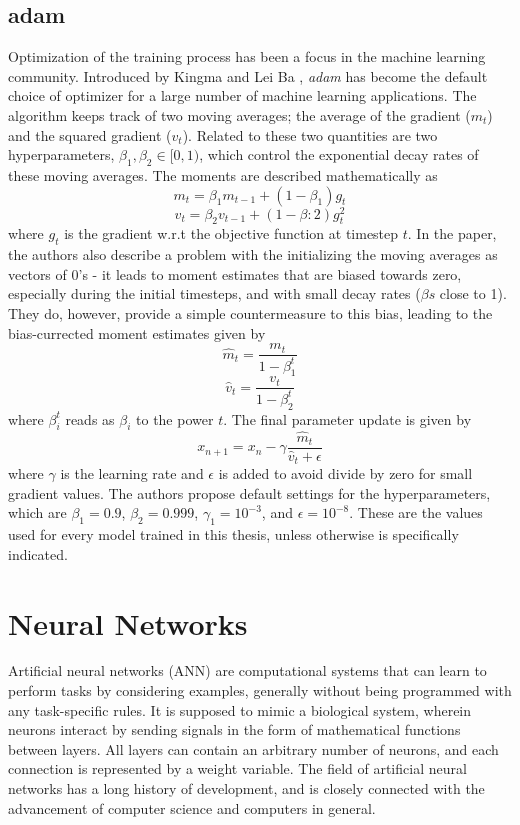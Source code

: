 \subsection{adam}
Optimization of the training process has been a focus in the machine learning
community. Introduced by Kingma and Lei Ba \cite{Kingma2015}, \textit{adam} has
become the default choice of optimizer for a large number of machine learning
applications. The algorithm keeps track of two moving averages; the average of the
gradient ($m_t$) and the squared gradient ($v_t$). Related to these two quantities
are two hyperparameters, $\beta_1, \beta_2 \in [0,1)$, which control the exponential
decay rates of these moving averages. The moments are described mathematically as
\begin{equation}
	m_t = \beta_1 m_{t-1} + (1 - \beta_1)g_t
\end{equation}
\begin{equation}
	v_t = \beta_2 v_{t-1} + (1 - \beta:2)g_t^2
\end{equation}
where $g_t$ is the gradient w.r.t the objective function at timestep $t$.
In the paper, the authors also describe a problem with the initializing the moving
averages as vectors of 0's - it leads to moment estimates that are biased towards
zero, especially during the initial timesteps, and with small decay rates ($\beta s$
close to 1). They do, however, provide a simple countermeasure to this bias, leading
to the bias-currected moment estimates given by
\begin{equation}
	\hat{m}_t = \frac{m_t}{1 - \beta_1^t}
\end{equation}
\begin{equation}
	\hat{v}_t = \frac{v_t}{1 - \beta_2^t}
\end{equation}
where $\beta_i^t$ reads as $\beta_i$ to the power $t$.
The final parameter update is given by
\begin{equation}
	x_{n+1} = x_n - \gamma\frac{\hat{m}_t}{\hat{v}_t + \epsilon}
\end{equation}
where $\gamma$ is the learning rate and $\epsilon$ is added to avoid divide by zero
for small gradient values. The authors propose default settings for the hyperparameters, which are
$\beta_1 = 0.9$, $\beta_2 = 0.999$, $\gamma_1 = 10^{-3}$, and $\epsilon = 10^{-8}$.
These are the values used for every model trained in this thesis, unless otherwise
is specifically indicated.

\section{Neural Networks}
Artificial neural networks (ANN) are computational systems that can learn to
perform tasks by considering examples, generally without being
programmed with any task-specific rules. It is supposed to mimic a
biological system, wherein neurons interact by sending signals in the
form of mathematical functions between layers. All layers can contain
an arbitrary number of neurons, and each connection is represented by
a weight variable.
The field of artificial neural networks has a long history of
development, and is closely connected with the advancement of computer
science and computers in general.

